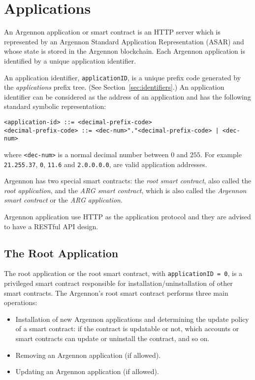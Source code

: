 

\section{Applications}\label{sec:applications}

An Argennon application or smart contract is an HTTP server which is represented by an Argennon Standard Application
Representation (ASAR) and whose state is stored in the Argennon blockchain. Each Argennon application is identified by
a unique application identifier.

An application identifier, \texttt{applicationID}, is
a unique prefix code generated by the \emph{applications} prefix tree. (See Section~\ref{sec:identifiers}.)
An application identifier can be considered as the address of an application and has the following standard symbolic
representation:
\begin{verbatim}
<application-id> ::= <decimal-prefix-code>
<decimal-prefix-code> ::= <dec-num>"."<decimal-prefix-code> | <dec-num>
\end{verbatim}
where \texttt{<dec-num>} is a normal decimal number between $0$ and $255$. For example \texttt{21.255.37},
\texttt{0}, \texttt{11.6} and \texttt{2.0.0.0.0}, are valid application addresses.

Argennon has two special smart contracts: the \emph{root smart contract}, also called the \emph{root application}, and
the \emph{ARG smart contract}, which is also called the \emph{Argennon smart contract} or the \emph{ARG application}.

Argennon application use HTTP as the application protocol and they are advised to have a RESTful API design.

\subsection{The Root Application}\label{subsec:the-root-app}

The root application or the root smart contract, with \texttt{applicationID = 0}, is a privileged smart contract
responsible for installation/uninstallation of other smart contracts. The Argennon's root smart contract
performs three main operations:

\begin{itemize}
    \item Installation of new Argennon applications and determining the update policy of a smart
    contract: if the contract is updatable or not, which accounts or smart contracts can update or uninstall
    the contract, and so on.
    \item Removing an Argennon application (if allowed).
    \item Updating an Argennon application (if allowed).
\end{itemize}

